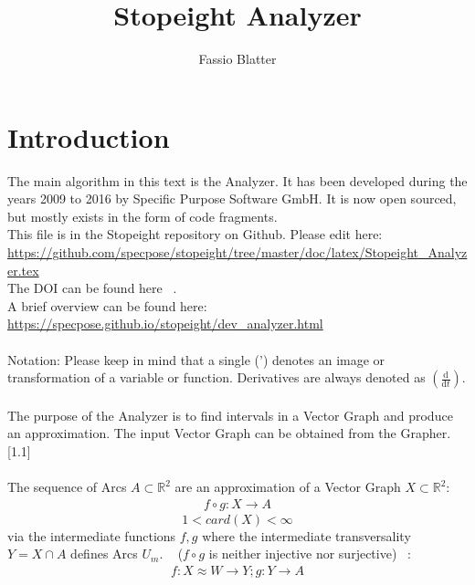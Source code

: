 \documentclass{report}
\begin{document}
\title{Stopeight Analyzer}
\author{Fassio Blatter}
\maketitle

\chapter{Introduction}
The main algorithm in this text is the Analyzer. It has been developed during the years 2009 to 2016 by Specific Purpose Software GmbH. It is now open sourced, but mostly exists in the form of code fragments.\\
This file is in the Stopeight repository on Github. Please edit here:\\
\href{https://github.com/specpose/stopeight/tree/master/doc/latex/Stopeight\_Analyzer.tex}{https://github.com/specpose/stopeight/tree/master/doc/latex/Stopeight\_Analyzer.tex}\\
The DOI can be found here ~\cite{Stopeight}.\\
A brief overview can be found here:\\
\href{https://specpose.github.io/stopeight/dev_analyzer.html}{https://specpose.github.io/stopeight/dev\_analyzer.html}\\\\
Notation: Please keep in mind that a single (') denotes an image or transformation of a variable or function. Derivatives are always denoted as $(\frac{\mathrm{d}}{\mathrm{d}t})$.\\\\
The purpose of the Analyzer is to find intervals in a Vector Graph and produce an approximation. The input Vector Graph can be obtained from the Grapher. \cite{Grapher}[1.1]\\\\
The sequence of Arcs $A \subset \mathbb{R}^2$ are an approximation of a Vector Graph $X \subset \mathbb{R}^2$:
\begin{align}
f \circ g: X \rightarrow A
\end{align}
\begin{equation*}
1 < card(X) < \infty
\end{equation*}
via the intermediate functions $f,g$ where the intermediate transversality $Y = X \cap A$ defines Arcs $U_{m}$. ~\cite[9.9]{Loring} ($f \circ g$ is neither injective nor surjective) ~\cite[2.1]{LauresSzymik}:
\begin{align}
f: X \approx W \rightarrow Y; g: Y \rightarrow A
\end{align}
\end{document}
